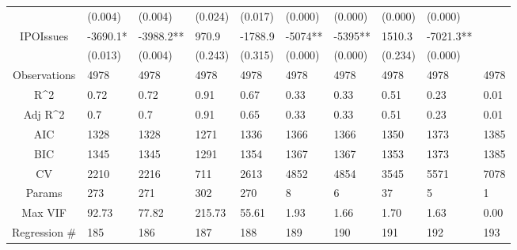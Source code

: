 \documentclass{article}
\begin{document}
\begin{table}[H]
\begin{tabular}{|clllllllll|}
   & (0.004) & (0.004) & (0.024) & (0.017) & (0.000) & (0.000) & (0.000) & (0.000) &  \\ 
  IPOIssues & -3690.1* & -3988.2** & 970.9 & -1788.9 & -5074** & -5395** & 1510.3 & -7021.3** &  \\ 
   & (0.013) & (0.004) & (0.243) & (0.315) & (0.000) & (0.000) & (0.234) & (0.000) &  \\ 
  \hline 
 Observations & 4978 & 4978 & 4978 & 4978 & 4978 & 4978 & 4978 & 4978 & 4978 \\ 
  R^2 & 0.72 & 0.72 & 0.91 & 0.67 & 0.33 & 0.33 & 0.51 & 0.23 & 0.01 \\ 
  Adj R^2 & 0.7 & 0.7 & 0.91 & 0.65 & 0.33 & 0.33 & 0.51 & 0.23 & 0.01 \\ 
  AIC & 1328 & 1328 & 1271 & 1336 & 1366 & 1366 & 1350 & 1373 & 1385 \\ 
  BIC & 1345 & 1345 & 1291 & 1354 & 1367 & 1367 & 1353 & 1373 & 1385 \\ 
  CV & 2210 & 2216 & 711 & 2613 & 4852 & 4854 & 3545 & 5571 & 7078 \\ 
  Params & 273 & 271 & 302 & 270 & 8 & 6 & 37 & 5 & 1 \\ 
  Max VIF & 92.73 & 77.82 & 215.73 & 55.61 & 1.93 & 1.66 & 1.70 & 1.63 & 0.00 \\ 
  Regression \# & 185 & 186 & 187 & 188 & 189 & 190 & 191 & 192 & 193 \\ 
   \hline
\end{tabular}
 
\end{table}
\end{document}
